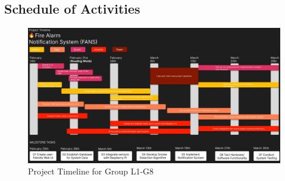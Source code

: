 \subsection{Schedule of Activities}

\begin{figure}[H]
    \centering
    \includegraphics[width=\linewidth]{../assets/SYSC3010_ProjectTimeline.jpg}
    \caption{Project Timeline for Group L1-G8}
\end{figure}
